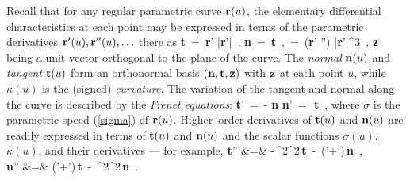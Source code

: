 Recall \cite{kreyszig59} that for any regular parametric curve
${\bf r}(u)$, the elementary differential characteristics at each
point may be expressed in terms of the parametric derivatives
${\bf r}'(u),{\bf r}''(u),\ldots$ there as
\be \label{diffchar}
{\bf t} \,=\, {{\bf r}' \over |{\bf r}'|} \,, \quad
{\bf n} \,=\, {\bf t}  \,, \quad
\kappa \,=\, {({\bf r}' '') 
  \over |{\bf r}'|^3} \,,
\ee
${\bf z}$ being a unit vector orthogonal to the plane of the curve.
The {\it normal\/} ${\bf n}(u)$ and {\it tangent\/} ${\bf t}(u)$ form
an orthonormal basis $({\bf n},{\bf t},{\bf z})$ with ${\bf z}$ at
each point $u$, while $\kappa(u)$ is the (signed) {\it curvature}.
The variation of the tangent and normal along the curve is described
by the {\it Frenet equations\/}:
\be \label{frenet}
{\bf t}' \,=\, -\,\sigma\kappa\,{\bf n}
 \quad
{\bf n}' \,=\, \sigma\kappa\,{\bf t} \,,
\ee
where $\sigma$ is the parametric speed (\ref{sigma}) of ${\bf r}(u)$.
Higher--order derivatives of ${\bf t}(u)$ and ${\bf n}(u)$ are readily
expressed in terms of ${\bf t}(u)$ and ${\bf n}(u)$ and the scalar
functions $\sigma(u)$, $\kappa(u)$, and their derivatives --- for
example,
\ba \label{frenet2}
{\bf t}'' \! &=& \! -\,\sigma^2\kappa^2\,{\bf t} \,-\,
(\sigma'\kappa+\sigma\kappa')\,{\bf n} \,, \nonumber \\
{\bf n}'' \! &=& \! (\sigma'\kappa+\sigma\kappa')\,{\bf t}
 \,-\, \sigma^2\kappa^2\,{\bf n} \,.
\ea

